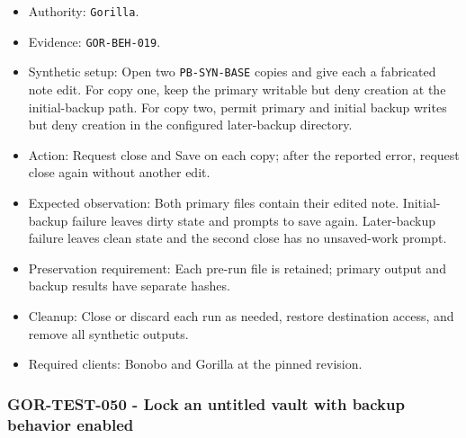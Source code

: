 \documentclass[
  letterpaper,
]{article}
\newcommand{\passthrough}[1]{#1}
\providecommand{\tightlist}{%
  \setlength{\itemsep}{0pt}\setlength{\parskip}{0pt}}
\begin{document}
\begin{itemize}
\tightlist
\item
  Authority: \passthrough{\lstinline!Gorilla!}.
\item
  Evidence: \nolinkurl{GOR-BEH-019}.
\item
  Synthetic setup: Open two \nolinkurl{PB-SYN-BASE} copies and give each a fabricated note edit. For copy one, keep the
  primary writable but deny creation at the initial-backup path. For copy two, permit primary and initial backup writes
  but deny creation in the configured later-backup directory.
\item
  Action: Request close and Save on each copy; after the reported error, request close again without another edit.
\item
  Expected observation: Both primary files contain their edited note. Initial-backup failure leaves dirty state and
  prompts to save again. Later-backup failure leaves clean state and the second close has no unsaved-work prompt.
\item
  Preservation requirement: Each pre-run file is retained; primary output and backup results have separate hashes.
\item
  Cleanup: Close or discard each run as needed, restore destination access, and remove all synthetic outputs.
\item
  Required clients: Bonobo and Gorilla at the pinned revision.
\end{itemize}

\subsubsection{GOR-TEST-050 - Lock an untitled vault with backup behavior
enabled}\label{gor-test-050---lock-an-untitled-vault-with-backup-behavior-enabled}
\end{document}

